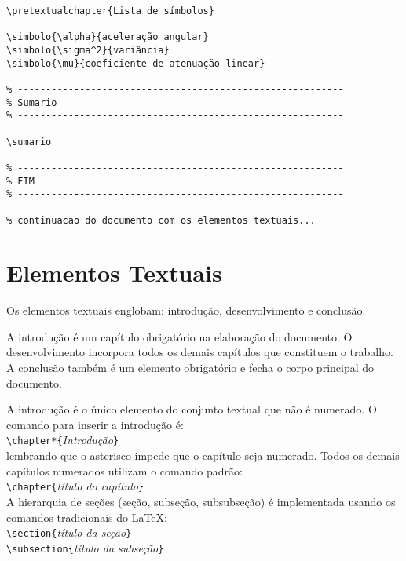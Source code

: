 \documentclass[a4paper,12pt,oneside,onecolumn]{article}
\newcommand{\comando}[1]{\texttt{\textbackslash #1}}
\newcommand{\param}[1]{\texttt{\{}\textsl{#1}\texttt{\}}}
\begin{document}
\begin{verbatim}
\pretextualchapter{Lista de símbolos}

\simbolo{\alpha}{aceleração angular}
\simbolo{\sigma^2}{variância}
\simbolo{\mu}{coeficiente de atenuação linear}

% ----------------------------------------------------------
% Sumario
% ----------------------------------------------------------

\sumario

% ----------------------------------------------------------
% FIM
% ----------------------------------------------------------

% continuacao do documento com os elementos textuais...
\end{verbatim}

\section{Elementos Textuais}

Os elementos textuais englobam: introdução, desenvolvimento e conclusão.

A introdução é um capítulo obrigatório na elaboração do documento. O desenvolvimento incorpora todos os demais capítulos que constituem o trabalho. A conclusão também é um elemento obrigatório e fecha o corpo principal do documento.

A introdução é o único elemento do conjunto textual que não é numerado. O comando para inserir a introdução é:\\

\comando{chapter*}\param{Introdução}\\

\noindent lembrando que o asterisco impede que o capítulo seja numerado. Todos os demais capítulos numerados utilizam o comando padrão:\\

\comando{chapter}\param{título do capítulo}\\

A hierarquia de seções (seção, subseção, subsubseção) é implementada usando os comandos tradicionais do \LaTeX:\\

\comando{section}\param{título da seção}\\

\comando{subsection}\param{título da subseção}\\
\end{document}
